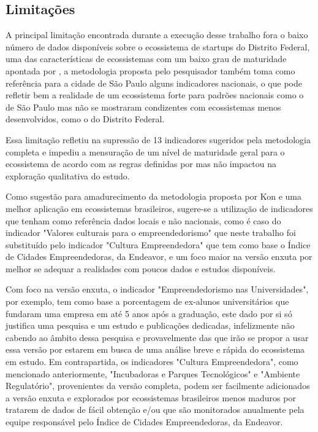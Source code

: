 \subsection{Limitações}
\label{subsection:limitações}

A principal limitação encontrada durante a execução desse trabalho fora o baixo número de dados disponíveis sobre o ecossistema de startups do Distrito Federal, uma das características de ecossistemas com um baixo grau de maturidade apontada por , a metodologia proposta pelo pesquisador também toma como referência para a cidade de São Paulo alguns indicadores nacionais, o que pode refletir bem a realidade de um ecossistema forte para padrões nacionais como o de São Paulo mas não se mostraram condizentes com ecossistemas menos desenvolvidos, como o do Distrito Federal.

Essa limitação refletiu na supressão de 13 indicadores sugeridos pela metodologia completa e impediu a mensuração de um nível de maturidade geral para o ecossistema de acordo com as regras definidas por  mas não impactou na exploração qualitativa do estudo.

Como sugestão para amadurecimento da metodologia proposta por Kon e uma melhor aplicação em ecossistemas brasileiros, sugere-se a utilização de indicadores que tenham como referência dados locais e não nacionais, como é caso do indicador "Valores culturais para o empreendedorismo" que neste trabalho foi substituído pelo indicador "Cultura Empreendedora" que tem como base o Índice de Cidades Empreendedoras, da Endeavor, e um foco maior na versão enxuta por melhor se adequar a realidades com poucos dados e estudos disponíveis. 

Com foco na versão enxuta, o indicador "Empreendedorismo nas Universidades", por exemplo, tem como base a porcentagem de ex-alunos universitários que fundaram uma empresa em até 5 anos após a graduação, este dado por si só justifica uma pesquisa e um estudo e publicações dedicadas, infelizmente não cabendo ao âmbito dessa pesquisa e provavelmente das que irão se propor a usar essa versão por estarem em busca de uma análise breve e rápida do ecossistema em estudo. Em contrapartida, os indicadores "Cultura Empreendedora", como mencionado anteriormente, "Incubadoras e Parques Tecnológicos" e "Ambiente Regulatório", provenientes da versão completa, podem ser facilmente adicionados a versão enxuta e explorados por ecossistemas brasileiros menos maduros por tratarem de dados de fácil obtenção e/ou que são monitorados anualmente pela equipe responsável pelo Índice de Cidades Empreendedoras, da Endeavor.

